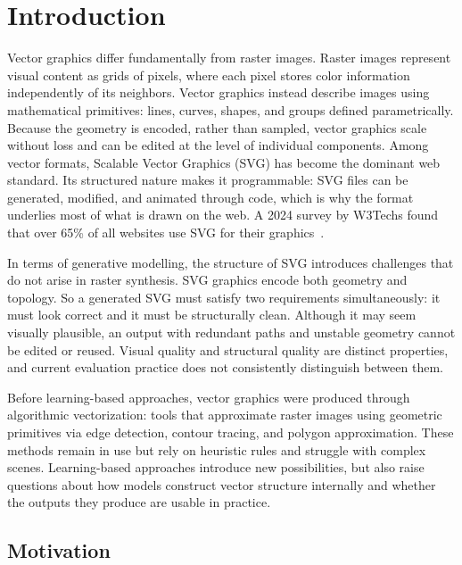 \chapter{Introduction}
\label{ch:Introduction}

Vector graphics differ fundamentally from raster images.
Raster images represent visual content as grids of pixels, 
where each pixel stores color information independently of its neighbors. 
Vector graphics instead describe images using mathematical primitives: 
lines, curves, shapes, and groups defined parametrically. 
Because the geometry is encoded, rather than sampled, vector graphics scale without loss 
and can be edited at the level of individual components. 
Among vector formats, Scalable Vector Graphics (SVG) has become 
the dominant web standard. Its structured nature makes it programmable: 
SVG files can be generated, modified, and animated through code, 
which is why the format underlies most of what is drawn on the web. 
A 2024 survey by W3Techs found that over 65\% of all websites use SVG for their graphics~\cite{w3techsSVG2024}.

In terms of generative modelling,
the structure of SVG introduces challenges that do not arise in raster synthesis.
SVG graphics encode both geometry and topology. 
So a generated SVG must satisfy two requirements simultaneously: 
it must look correct and it must be structurally clean. 
Although it may seem visually plausible, an output with redundant paths 
and unstable geometry cannot be edited or reused. 
Visual quality and structural quality are distinct properties, 
and current evaluation practice does not consistently distinguish between them.

Before learning-based approaches, vector graphics were 
produced through algorithmic vectorization: tools that 
approximate raster images using geometric primitives 
via edge detection, contour tracing, and polygon 
approximation. These methods remain in use 
but rely on heuristic rules and struggle with complex 
scenes. Learning-based approaches introduce new 
possibilities, but also raise questions about how 
models construct vector structure internally and 
whether the outputs they produce are usable in practice.


\section{Motivation}

